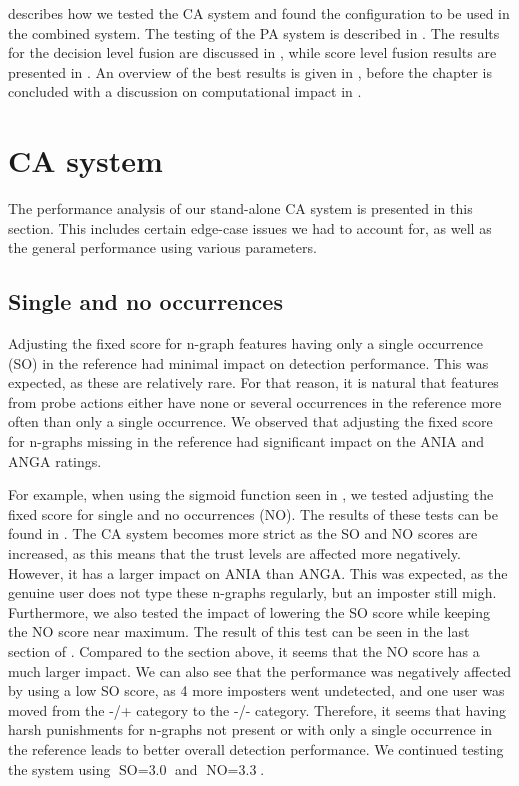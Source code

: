  describes how we tested the CA system and found the configuration to be used in the combined system. 
The testing of the PA system is described in .
The results for the decision level fusion are discussed in , while score level fusion results are presented in .
An overview of the best results is given in , before the chapter is concluded with a discussion on computational impact in .


\section{CA system}
\label{sec:analysis-CA}
The performance analysis of our stand-alone CA system is presented in this section.
This includes certain edge-case issues we had to account for, as well as the general performance using various parameters.

\subsection{Single and no occurrences}
\label{sec:analysis-CA-SONO}
Adjusting the fixed score for n-graph features having only a single occurrence (SO) in the reference had minimal impact on detection performance.
This was expected, as these are relatively rare.
For that reason, it is natural that features from probe actions either have none or several occurrences in the reference more often than only a single occurrence.
We observed that adjusting the fixed score for n-graphs missing in the reference had significant impact on the ANIA and ANGA ratings.

For example, when using the sigmoid function seen in , we tested adjusting the fixed score for single and no occurrences (NO).
The results of these tests can be found in .
The CA system becomes more strict as the SO and NO scores are increased, as this means that the trust levels are affected more negatively.
However, it has a larger impact on ANIA than ANGA.
This was expected, as the genuine user does not type these n-graphs regularly, but an imposter still migh.
Furthermore, we also tested the impact of lowering the SO score while keeping the NO score near maximum.
The result of this test can be seen in the last section of .
Compared to the section above, it seems that the NO score has a much larger impact.
We can also see that the performance was negatively affected by using a low SO score, as 4 more imposters went undetected, and one user was moved from the -/+ category to the -/- category.
Therefore, it seems that having harsh punishments for n-graphs not present or with only a single occurrence in the reference leads to better overall detection performance.
We continued testing the system using $\text{SO} = \text{3.0}$ and $\text{NO} = \text{3.3}$.

